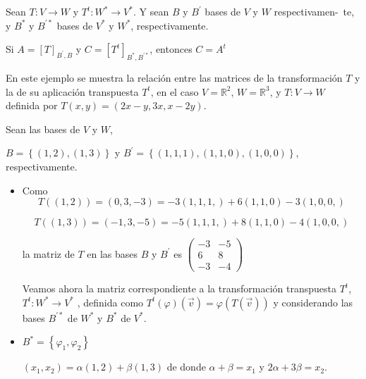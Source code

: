 \bigskip

\noindent
Sean $T: V \rightarrow W$  y  $T^t: W^* \rightarrow V^*$. Y sean $B$ y $B^{\prime}$ bases de $V$ y $W$ respectivamen-\ 
te, y  $B^*$ y $B^{\prime *}$   bases de $ V^*$  y $W^*$, respectivamente.


\bigskip

 Si $A=\left[T\right]_{B ^{\prime},B}$ y $C=\left[T^t\right]_{ B^*  ,B ^{\prime *}}$, entonces $C=A^t$


\bigskip


\begin{example}

 En este ejemplo se muestra la relación  entre las matrices de la transformación $T$ y la  de su aplicación  transpuesta $ T^t$, en el caso   $V=\mathbb{R}^2$, $W=\mathbb{R}^3$, y $T: V \rightarrow W$ definida por 
  $T(x,y)=(2x-y,3x,x-2y)$.
  
  Sean las bases de $V$ y $W$,

\bigskip

$B= \left\{(1,2),(1,3)\right\}$  y $B^{\prime}= \left\{(1,1,1),(1,1,0),(1,0,0)\right\}$, respectivamente.
 
\bigskip



\begin{itemize}
    \item 
    Como
$$T((1,2))=  (0,3,-3)= -3(1,1,1,) + 6(1,1,0) -3(1,0,0,)$$

$$T((1,3))=  (-1,3,-5)= -5(1,1,1,) + 8(1,1,0) -4(1,0,0,)$$
\bigskip

la matriz de $T$ en las bases $B$ y $ B^{\prime}$ es 
$\left(\begin{array}{cc}  -3 & -5  \\ 6 &  8 \\ -3  &  -4
\end{array}
 \right)$

\bigskip

Veamos ahora la matriz correspondiente a la transformación transpuesta $ T^t$, $T^t: W^* \rightarrow V^*$ , definida como $T^t(\varphi)(\vec v)=\varphi(T(\vec v))$ y considerando las bases $B^{\prime *}$  de $W^*$  y $B^*$  de $V^*$.
  \item
 $B^*= \left\{ \varphi_1, \varphi_2 \right\}$ 
 
 \bigskip
 
$(x_1,x_2)= \alpha (1,2) + \beta ( 1,3)$
de donde $\alpha + \beta =x_1$ y $2\alpha + 3\beta =x_2$.

\bigskip


\end{itemize}
\end{example}
